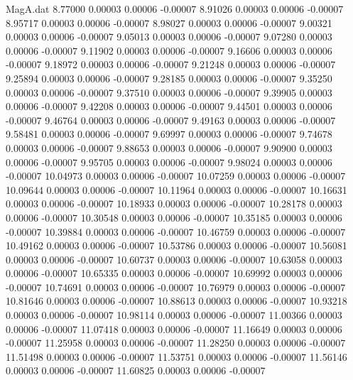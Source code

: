 \begin{filecontents}{MagA.dat}
   8.77000    0.00003    0.00006   -0.00007
   8.91026    0.00003    0.00006   -0.00007
   8.95717    0.00003    0.00006   -0.00007
   8.98027    0.00003    0.00006   -0.00007
   9.00321    0.00003    0.00006   -0.00007
   9.05013    0.00003    0.00006   -0.00007
   9.07280    0.00003    0.00006   -0.00007
   9.11902    0.00003    0.00006   -0.00007
   9.16606    0.00003    0.00006   -0.00007
   9.18972    0.00003    0.00006   -0.00007
   9.21248    0.00003    0.00006   -0.00007
   9.25894    0.00003    0.00006   -0.00007
   9.28185    0.00003    0.00006   -0.00007
   9.35250    0.00003    0.00006   -0.00007
   9.37510    0.00003    0.00006   -0.00007
   9.39905    0.00003    0.00006   -0.00007
   9.42208    0.00003    0.00006   -0.00007
   9.44501    0.00003    0.00006   -0.00007
   9.46764    0.00003    0.00006   -0.00007
   9.49163    0.00003    0.00006   -0.00007
   9.58481    0.00003    0.00006   -0.00007
   9.69997    0.00003    0.00006   -0.00007
   9.74678    0.00003    0.00006   -0.00007
   9.88653    0.00003    0.00006   -0.00007
   9.90900    0.00003    0.00006   -0.00007
   9.95705    0.00003    0.00006   -0.00007
   9.98024    0.00003    0.00006   -0.00007
  10.04973    0.00003    0.00006   -0.00007
  10.07259    0.00003    0.00006   -0.00007
  10.09644    0.00003    0.00006   -0.00007
  10.11964    0.00003    0.00006   -0.00007
  10.16631    0.00003    0.00006   -0.00007
  10.18933    0.00003    0.00006   -0.00007
  10.28178    0.00003    0.00006   -0.00007
  10.30548    0.00003    0.00006   -0.00007
  10.35185    0.00003    0.00006   -0.00007
  10.39884    0.00003    0.00006   -0.00007
  10.46759    0.00003    0.00006   -0.00007
  10.49162    0.00003    0.00006   -0.00007
  10.53786    0.00003    0.00006   -0.00007
  10.56081    0.00003    0.00006   -0.00007
  10.60737    0.00003    0.00006   -0.00007
  10.63058    0.00003    0.00006   -0.00007
  10.65335    0.00003    0.00006   -0.00007
  10.69992    0.00003    0.00006   -0.00007
  10.74691    0.00003    0.00006   -0.00007
  10.76979    0.00003    0.00006   -0.00007
  10.81646    0.00003    0.00006   -0.00007
  10.88613    0.00003    0.00006   -0.00007
  10.93218    0.00003    0.00006   -0.00007
  10.98114    0.00003    0.00006   -0.00007
  11.00366    0.00003    0.00006   -0.00007
  11.07418    0.00003    0.00006   -0.00007
  11.16649    0.00003    0.00006   -0.00007
  11.25958    0.00003    0.00006   -0.00007
  11.28250    0.00003    0.00006   -0.00007
  11.51498    0.00003    0.00006   -0.00007
  11.53751    0.00003    0.00006   -0.00007
  11.56146    0.00003    0.00006   -0.00007
  11.60825    0.00003    0.00006   -0.00007

\end{filecontents}
